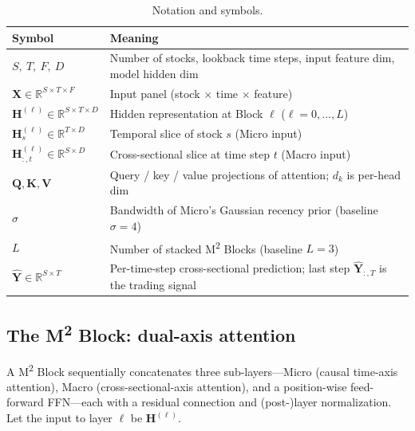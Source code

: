 \documentclass[a4paper,11pt]{article}
\newcommand{\msq}{\texorpdfstring{M\textsuperscript{2}}{M2}}             %
\begin{document}
\begin{table}[H]
\centering
\caption{Notation and symbols.}
\label{tab:notation}
\begin{tabularx}{\linewidth}{l>{\raggedright\arraybackslash}X}
\toprule
Symbol & Meaning \\
\midrule
$S,\ T,\ F,\ D$ & Number of stocks, lookback time steps, input feature dim, model hidden dim \\
$\bm{X}\in\mathbb{R}^{S\times T\times F}$ & Input panel (stock $\times$ time $\times$ feature) \\
$\bm{H}^{(\ell)}\in\mathbb{R}^{S\times T\times D}$ & Hidden representation at Block $\ell$ ($\ell=0,\dots,L$) \\
$\bm{H}^{(\ell)}_{s}\in\mathbb{R}^{T\times D}$ & Temporal slice of stock $s$ (Micro input) \\
$\bm{H}^{(\ell)}_{:,t}\in\mathbb{R}^{S\times D}$ & Cross-sectional slice at time step $t$ (Macro input) \\
$\bm{Q},\bm{K},\bm{V}$ & Query / key / value projections of attention; $d_k$ is per-head dim \\
$\sigma$ & Bandwidth of Micro's Gaussian recency prior (baseline $\sigma{=}4$) \\
$L$ & Number of stacked \msq{} Blocks (baseline $L{=}3$) \\
$\hat{\bm{Y}}\in\mathbb{R}^{S\times T}$ & Per-time-step cross-sectional prediction; last step $\hat{\bm{Y}}_{:,T}$ is the trading signal \\
\bottomrule
\end{tabularx}
\end{table}

\subsection{The \msq{} Block: dual-axis attention}\label{sec:m-block}
A \msq{} Block sequentially concatenates three sub-layers---Micro (causal
time-axis attention), Macro (cross-sectional-axis attention), and a
position-wise feed-forward FFN---each with a residual connection and
(post-)layer normalization. Let the input to layer $\ell$ be $\bm{H}^{(\ell)}$.
\end{document}
